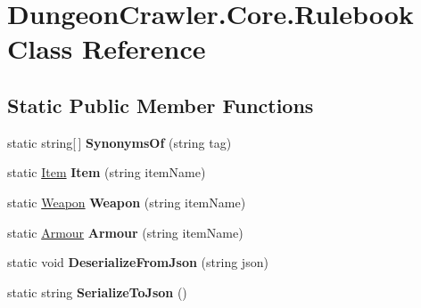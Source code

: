 \hypertarget{class_dungeon_crawler_1_1_core_1_1_rulebook}{}\section{Dungeon\+Crawler.\+Core.\+Rulebook Class Reference}
\label{class_dungeon_crawler_1_1_core_1_1_rulebook}
\subsection*{Static Public Member Functions}
\begin{DoxyCompactItemize}
\item 
\hypertarget{class_dungeon_crawler_1_1_core_1_1_rulebook_a8421b5449b51ff2de2256f88414b94db}{}static string\mbox{[}$\,$\mbox{]} {\bfseries Synonyms\+Of} (string tag)\label{class_dungeon_crawler_1_1_core_1_1_rulebook_a8421b5449b51ff2de2256f88414b94db}

\item 
\hypertarget{class_dungeon_crawler_1_1_core_1_1_rulebook_aa4c46db7c8c18c08ed85ecc7439bda98}{}static \hyperlink{class_dungeon_crawler_1_1_core_1_1_item}{Item} {\bfseries Item} (string item\+Name)\label{class_dungeon_crawler_1_1_core_1_1_rulebook_aa4c46db7c8c18c08ed85ecc7439bda98}

\item 
\hypertarget{class_dungeon_crawler_1_1_core_1_1_rulebook_a14b53fce8a768d28d1da9ac61f9d433d}{}static \hyperlink{class_dungeon_crawler_1_1_core_1_1_weapon}{Weapon} {\bfseries Weapon} (string item\+Name)\label{class_dungeon_crawler_1_1_core_1_1_rulebook_a14b53fce8a768d28d1da9ac61f9d433d}

\item 
\hypertarget{class_dungeon_crawler_1_1_core_1_1_rulebook_afb832f325d7806ce9ab5199c68ddc7ed}{}static \hyperlink{class_dungeon_crawler_1_1_core_1_1_armour}{Armour} {\bfseries Armour} (string item\+Name)\label{class_dungeon_crawler_1_1_core_1_1_rulebook_afb832f325d7806ce9ab5199c68ddc7ed}

\item 
\hypertarget{class_dungeon_crawler_1_1_core_1_1_rulebook_ad07da757abd45ca3e99c18be74ee845f}{}static void {\bfseries Deserialize\+From\+Json} (string json)\label{class_dungeon_crawler_1_1_core_1_1_rulebook_ad07da757abd45ca3e99c18be74ee845f}

\item 
\hypertarget{class_dungeon_crawler_1_1_core_1_1_rulebook_a9885764a9561d091f425316042987e8b}{}static string {\bfseries Serialize\+To\+Json} ()\label{class_dungeon_crawler_1_1_core_1_1_rulebook_a9885764a9561d091f425316042987e8b}

\end{DoxyCompactItemize}
